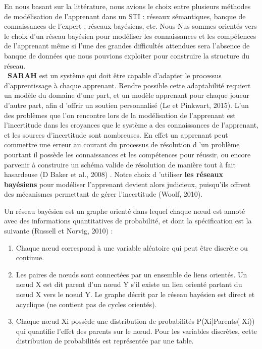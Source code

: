  En nous basant sur la littérature, nous avions le choix entre plusieurs méthodes de modélisation de l'apprenant dans un STI : réseaux sémantiques, banque de connaissances de l'expert , réseaux bayésiens, etc. Nous Nus sommes orientés vers le choix d'un réseau bayésien pour modéliser les connaissances et les compétences de l'apprenant même si l'une des grandes difficultés attendues sera l'absence de banque de données que nous pouvions exploiter pour construire la structure du réseau.\\\
\textbf{SARAH} est un système qui doit être capable d'adapter le processus d'apprentissage à chaque apprenant. Rendre possible cette adaptabilité requiert un modèle du domaine d'une part, et un modèle apprenant pour chaque joueur d'autre part, afin d 'offrir un soutien personnalisé (Le et Pinkwart, 2015). L'un des problèmes que l'on rencontre lors de la modélisation de l'apprenant est l'incertitude dans les croyances que le système a des connaissances de l'apprenant, et les sources d'incertitude sont nombreuses. En effet un apprenant peut commettre une erreur au courant du processus de résolution d 'un problème pourtant il possède les connaissances et les compétences pour réussir, ou encore parvenir à construire un schéma valide de résolution de manière tout à fait hasardeuse (D Baker et al., 2008) . Notre choix d 'utiliser \textbf{les réseaux bayésiens} pour modéliser l'apprenant devient alors judicieux, puisqu'ils offrent des mécanismes permettant de gérer l'incertitude (Woolf, 2010). 

Un réseau bayésien est un graphe orienté dans lequel chaque nœud est annoté avec des informations quantitatives de probabilité, et dont la spécification est la suivante (Russell et Norvig, 2010) :
\begin{enumerate}
\item Chaque nœud correspond à une variable aléatoire qui peut être discrète ou continue.
\item  Les paires de nœuds sont connectées par un ensemble de liens orientés. Un nœud X est dit parent d'un nœud Y s'il existe un lien orienté partant du nœud X vers le nœud Y. Le graphe décrit par le réseau bayésien est direct et acyclique (ne contient pas de cycles orientés).
\item  Chaque nœud Xi possède une distribution de probabilités P(Xi|Parents( Xi)) qui quantifie l'effet des parents sur le nœud. Pour les variables discrètes, cette distribution de probabilités est représentée par une table. 
\end{enumerate}
 

